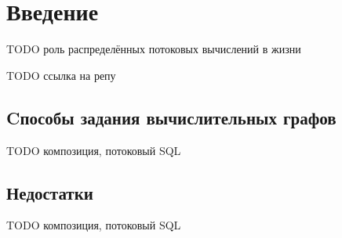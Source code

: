 \section{Введение}

TODO роль распределённых потоковых вычислений в жизни

TODO ссылка на репу

\subsection{Cпособы задания вычислительных графов}

TODO композиция, потоковый SQL

\subsection{Недостатки}

TODO композиция, потоковый SQL
